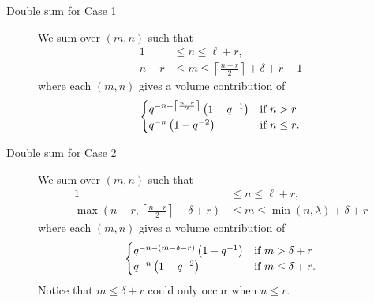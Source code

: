 \begin{description}
\item[Double sum for Case 1]
We sum over $(m,n)$ such that
\begin{equation}
  \begin{aligned}
    1 &\leq n \leq \ell + r, \\
    n-r &\leq m \leq \left\lceil \frac{n-r}{2} \right\rceil+\delta+r - 1
  \end{aligned}
  \label{eq:odd_range1}
\end{equation}
where each $(m,n)$ gives a volume contribution of
\begin{equation}
  \begin{cases}
    q^{-n - \left\lceil \frac{n-r}{2} \right\rceil} \left( 1 - q^{-1} \right)
      & \text{if $n > r$} \\
    q^{-n} \left( 1 - q^{-2} \right)
      & \text{if $n \leq r$}.
  \end{cases}
  \label{eq:case_1_vol_contrib}
\end{equation}

\item[Double sum for Case 2]
We sum over $(m,n)$ such that
\begin{equation}
  \begin{aligned}
    1 &\leq n \leq \ell + r, \\
    \max\left(n-r, \left\lceil \frac{n-r}{2} \right\rceil+\delta+r \right)
    &\leq m \leq \min(n,\lambda)+\delta+r
  \end{aligned}
  \label{eq:odd_range2}
\end{equation}
where each $(m,n)$ gives a volume contribution of
\begin{equation}
  \begin{cases}
    q^{-n - (m-\delta-r)} \left( 1 - q^{-1} \right)
      & \text{if $m > \delta + r$} \\
    q^{-n} \left( 1 - q^{-2} \right)
      & \text{if $m \le \delta + r$}.
  \end{cases}
  \label{eq:case_2_vol_contrib}
\end{equation}
Notice that $m \leq \delta + r$ could only occur when $n \leq r$.
\end{description}


